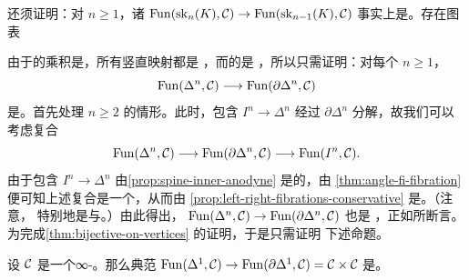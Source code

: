 还须证明：对 $n \ge 1$，诸\trFunctor{}%
$\mathrm{Fun}(\mathrm{sk}_n(K), \mathcal{C}) \to \mathrm{Fun}(\mathrm{sk}_{n-1}(K), \mathcal{C})$
事实上是\trConservative。存在\trPullback{}图表
\begin{center}
\end{center}
由于\trConservative{}\trFunctor{}的乘积是\trConservative，所有竖直映射都是%
\trInnerFibration{}，而\trConservative{}\trInnerFibration{}的\trPullback{}是%
\trConservative，所以只需证明：对每个
$n \ge 1$，\trFunctor{}%
\[
\mathrm{Fun}(\Delta^n, \mathcal{C}) \longrightarrow \mathrm{Fun}(\partial \Delta^n, \mathcal{C})
\]
是\trConservative。首先处理 $n \ge 2$ 的情形。此时，包含 $I^n \to \Delta^n$ 经过
$\partial \Delta^n$ 分解，故我们可以考虑复合
\[
\mathrm{Fun}(\Delta^n, \mathcal{C}) \longrightarrow \mathrm{Fun}(\partial \Delta^n, \mathcal{C})
\longrightarrow \mathrm{Fun}(I^n, \mathcal{C}).
\]
由于包含 $I^n \to \Delta^n$ 由\cref{prop:spine-inner-anodyne} 是\trInnerAnodyne{}的，由
\cref{thm:angle-fi-fibration} 便可知上述复合是一个\trTrivialFibration{}，从而由
\cref{prop:left-right-fibrations-conservative} 是\trConservative。（注意，\trTrivialFibration{}%
特别地是\trLeftFibration{}与\trRightFibration{}。）由此得出，
$\mathrm{Fun}(\Delta^n, \mathcal{C}) \to \mathrm{Fun}(\partial \Delta^n, \mathcal{C})$ 也是%
\trConservative，正如所断言。为完成\cref{thm:bijective-on-vertices} 的证明，于是只需证明
下述命题。

\begin{proposition}\label{prop:fun-delta1-boundary-conservative}
设 $\mathcal{C}$ 是一个∞-\trCategory{}。那么典范\trFunctor{}%
$\mathrm{Fun}(\Delta^1, \mathcal{C}) \to \mathrm{Fun}(\partial \Delta^1, \mathcal{C}) = \mathcal{C} \times \mathcal{C}$
是\trConservative。
\end{proposition}

